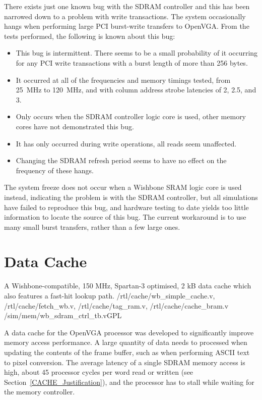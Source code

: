 There exists just one known bug with the SDRAM controller and this has been
narrowed down to a problem with write transactions. The system occasionally hangs
when performing large PCI burst-write transfers to OpenVGA. From the tests
performed, the following is known about this bug:

\begin{itemize}
  \item This bug is intermittent. There seems to be a small probability of it
  occurring for any PCI write transactions with a burst length of more than 256
  bytes.
  \item It occurred at all of the frequencies and memory timings tested, from
  25~MHz to 120~MHz, and with column address strobe latencies of 2, 2.5, and 3.
  \item Only occurs when the SDRAM controller logic core is used, other memory
  cores have not demonstrated this bug.
  \item It has only occurred during write operations, all reads seem unaffected.
  \item Changing the SDRAM refresh period seems to have no effect on the
  frequency of these hangs.
\end{itemize}

The system freeze does not occur when a Wishbone SRAM logic core is used instead,
indicating the problem is with the SDRAM controller, but all simulations have
failed to reproduce this bug, and hardware testing to date yields too little
information to locate the source of this bug. The current workaround is to use
many small burst transfers, rather than a few large ones.


\section{Data Cache}
\label{MEM_Cache}

{A Wishbone-compatible, 150 MHz, Spartan-3 optimised, 2 kB data cache which also
features a fast-hit lookup path.} {/rtl/cache/wb\_simple\_cache.v,
/rtl/cache/fetch\_wb.v, /rtl/cache/tag\_ram.v, /rtl/cache/cache\_bram.v}
{/sim/mem/wb\_sdram\_ctrl\_tb.v}{GPL}

A data cache for the OpenVGA processor was developed to significantly improve
memory access performance. A large quantity of data needs to processed when
updating the contents of the frame buffer, such as when performing ASCII text to
pixel conversion. The average latency of a single SDRAM memory access is high,
about 45 processor cycles per word read or written (see
Section~\ref{CACHE_Justification}), and the processor has to stall while waiting
for the memory controller.

